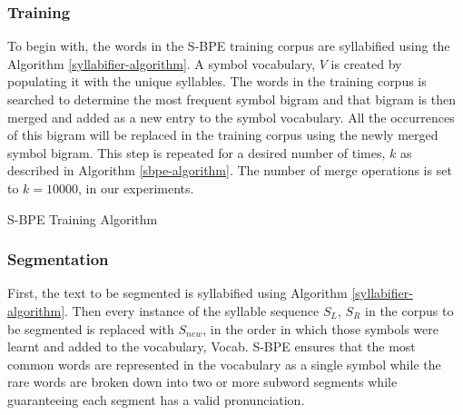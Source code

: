 \subsubsection{Training}
To begin with, the words in the S-BPE training corpus are syllabified using the
Algorithm \ref{syllabifier-algorithm}. A symbol vocabulary, $V$ is created by
populating it with the unique syllables. The words in the training corpus is
searched to determine the most frequent symbol bigram and that bigram is then
merged and added as a new entry to the symbol vocabulary. All the occurrences
of this bigram will be replaced in the training corpus using the newly merged
symbol bigram. This step is repeated for a desired number of times, $k$ as
described in Algorithm \ref{sbpe-algorithm}. The number of merge operations is
set to $k=10000$, in our experiments.

\begin{algorithm}[ht]
    \caption{S-BPE Training Algorithm}\label{sbpe-algorithm}
    \begin{algorithmic}[1]
         
         
        \EndWhile
        \EndProcedure
    \end{algorithmic}
\end{algorithm}


\subsubsection{Segmentation}

First, the text to be segmented is syllabified using Algorithm
\ref{syllabifier-algorithm}. Then every instance of the syllable sequence
$S_L$, $S_R$ in the corpus to be segmented is replaced with $S_{new}$, in the
order in which those symbols were learnt and added to the vocabulary, {\ipa Vocab}. S-BPE
ensures that the most common words are represented in the vocabulary as a
single symbol while the rare words are broken down into two or more subword
segments while guaranteeing each segment has a valid pronunciation.

